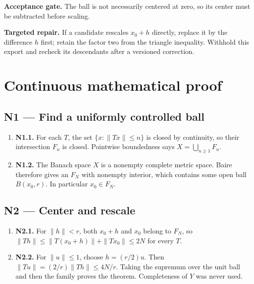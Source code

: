 \documentclass[preprint,12pt,aps,pra,showkeys,amsmath,amssymb,superscriptaddress,floatfix]{revtex4-2}
\theoremstyle{definition}
\theoremstyle{remark}
\newcommand{\field}[2]{\par\smallskip\noindent\textbf{#1.} #2\par}
\begin{document}
\field{Acceptance gate}{The ball is not necessarily centered at zero, so its center must be
subtracted before scaling.}

\field{Targeted repair}{If a candidate rescales \(x_0+h\) directly, replace it by the difference
\(h\) first; retain the factor two from the triangle inequality.
Withhold this export and recheck its descendants after a versioned
correction.}

\endgroup\clearpage\section{Continuous mathematical proof}\label{sec:proof}

\subsection{N1 --- Find a uniformly controlled
ball}\label{n1-find-a-uniformly-controlled-ball}

\begin{enumerate}
\def\labelenumi{\arabic{enumi}.}
\item
  \textbf{N1.1.} For each \(T\), the set \(\{x:\|Tx\|\le n\}\) is closed
  by continuity, so their intersection \(F_n\) is closed. Pointwise
  boundedness says \(X=\bigcup_{n\ge1}F_n\).
\item
  \textbf{N1.2.} The Banach space \(X\) is a nonempty complete metric
  space. Baire therefore gives an \(F_N\) with nonempty interior, which
  contains some open ball \(B(x_0,r)\). In particular \(x_0\in F_N\).
\end{enumerate}

\subsection{N2 --- Center and rescale}\label{n2-center-and-rescale}

\begin{enumerate}
\def\labelenumi{\arabic{enumi}.}
\item
  \textbf{N2.1.} For \(\|h\|<r\), both \(x_0+h\) and \(x_0\) belong to
  \(F_N\), so \(\|Th\|\le\|T(x_0+h)\|+\|Tx_0\|\le2N\) for every \(T\).
\item
  \textbf{N2.2.} For \(\|u\|\le1\), choose \(h=(r/2)u\). Then
  \(\|Tu\|=(2/r)\|Th\|\le4N/r\). Taking the supremum over the unit ball
  and then the family proves the theorem. Completeness of \(Y\) was
  never used.
\end{enumerate}
\end{document}
